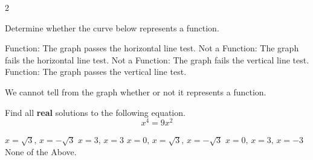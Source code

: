 \begin{questions}
\begin{multicols}{2}
\begin{checkboxes}

\end{checkboxes}
\end{multicols}

\newpage
\question[3] Determine whether the curve below represents a function.

\begin{center}

    
\end{center}
\begin{checkboxes}
    \choice Function: The graph passes the horizontal line test.
    \choice Not a Function: The graph fails the horizontal line test.
    \choice Not a Function: The graph fails the vertical line test.
    \choice Function: The graph passes the vertical line test.
    
    \choice We cannot tell from the graph whether or not it represents a function.
\end{checkboxes}


\question[3] Find all \textbf{real} solutions to the following equation.
\[ x^4=9x^2\]
\begin{checkboxes}
    \choice $x=\sqrt{3},\, x=-\sqrt{3}$
    \choice $x=3,\,x=3$
    \choice $x=0,\,x=\sqrt{3},\,x=-\sqrt{3}$
    \choice $x=0,\,x=3,\,x=-3$
    \choice None of the Above.
\end{checkboxes}


\end{questions}
